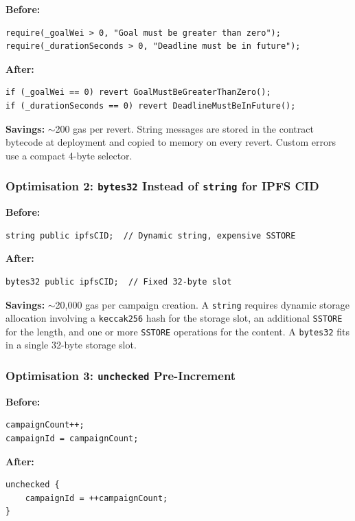 \textbf{Before:}
\begin{lstlisting}[language=Solidity]
require(_goalWei > 0, "Goal must be greater than zero");
require(_durationSeconds > 0, "Deadline must be in future");
\end{lstlisting}

\textbf{After:}
\begin{lstlisting}[language=Solidity]
if (_goalWei == 0) revert GoalMustBeGreaterThanZero();
if (_durationSeconds == 0) revert DeadlineMustBeInFuture();
\end{lstlisting}

\textbf{Savings:} $\sim$200 gas per revert. String messages are stored in the contract bytecode at deployment and copied to memory on every revert. Custom errors use a compact 4-byte selector.

\subsubsection{Optimisation 2: \texttt{bytes32} Instead of \texttt{string} for IPFS CID}

\textbf{Before:}
\begin{lstlisting}[language=Solidity]
string public ipfsCID;  // Dynamic string, expensive SSTORE
\end{lstlisting}

\textbf{After:}
\begin{lstlisting}[language=Solidity]
bytes32 public ipfsCID;  // Fixed 32-byte slot
\end{lstlisting}

\textbf{Savings:} $\sim$20,000 gas per campaign creation. A \texttt{string} requires dynamic storage allocation involving a \texttt{keccak256} hash for the storage slot, an additional \texttt{SSTORE} for the length, and one or more \texttt{SSTORE} operations for the content. A \texttt{bytes32} fits in a single 32-byte storage slot.

\subsubsection{Optimisation 3: \texttt{unchecked} Pre-Increment}

\textbf{Before:}
\begin{lstlisting}[language=Solidity]
campaignCount++;
campaignId = campaignCount;
\end{lstlisting}

\textbf{After:}
\begin{lstlisting}[language=Solidity]
unchecked {
    campaignId = ++campaignCount;
}
\end{lstlisting}

